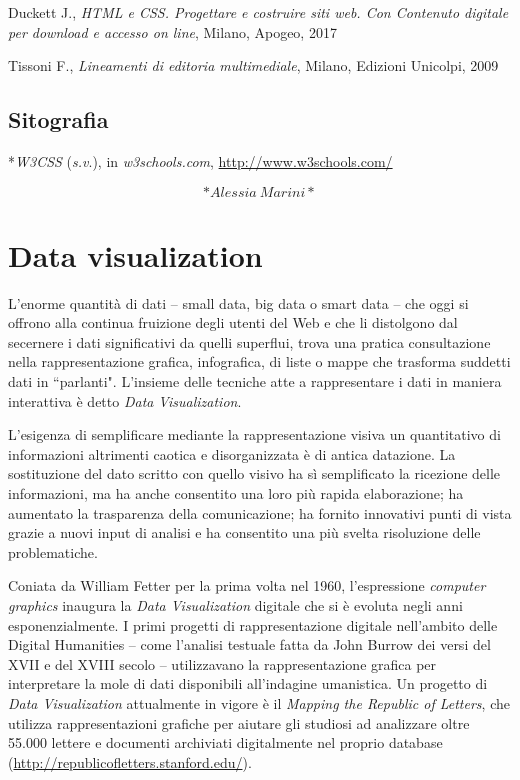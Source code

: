 \documentclass[
  b5paper,
  twoside,
  12pt,
  chapterprefix=false,
  bibliography=totocnumbered,
  parskip=false]{scrbook}
\begin{document}
Duckett J., \emph{HTML e CSS. Progettare e costruire siti web. Con Contenuto
digitale per download e accesso on line}, Milano, Apogeo, 2017

Tissoni F., \emph{Lineamenti di editoria multimediale}, Milano, Edizioni
Unicolpi, 2009

\hypertarget{sitografia-6}{%
\section*{Sitografia}\label{sitografia-6}}

*\emph{W3CSS} (\emph{s.v}.), in \emph{w3schools.com},
\url{http://www.w3schools.com/}

\[*Alessia~Marini*\]

\hypertarget{data-visualization}{%
\chapter{Data visualization}\label{data-visualization}}

L'enorme quantità di dati -- small data, big data o smart data -- che
oggi si offrono alla continua fruizione degli utenti del Web e che li
distolgono dal secernere i dati significativi da quelli superflui, trova
una pratica consultazione nella rappresentazione grafica, infografica,
di liste o mappe che trasforma suddetti dati in ``parlanti". L'insieme
delle tecniche atte a rappresentare i dati in maniera interattiva è
detto \emph{Data} \emph{Visualization}.

L'esigenza di semplificare mediante la rappresentazione visiva un
quantitativo di informazioni altrimenti caotica e disorganizzata è di
antica datazione. La sostituzione del dato scritto con quello visivo ha
sì semplificato la ricezione delle informazioni, ma ha anche consentito
una loro più rapida elaborazione; ha aumentato la trasparenza della
comunicazione; ha fornito innovativi punti di vista grazie a nuovi input
di analisi e ha consentito una più svelta risoluzione delle
problematiche.

Coniata da William Fetter per la prima volta nel 1960, l'espressione
\emph{computer} \emph{graphics} inaugura la \emph{Data Visualization} digitale che si è
evoluta negli anni esponenzialmente. I primi progetti di
rappresentazione digitale nell'ambito delle Digital Humanities -- come
l'analisi testuale fatta da John Burrow dei versi del XVII e del XVIII
secolo -- utilizzavano la rappresentazione grafica per interpretare la
mole di dati disponibili all'indagine umanistica. Un progetto di \emph{Data
Visualization} attualmente in vigore è il \emph{Mapping the Republic of
Letters}, che utilizza rappresentazioni grafiche per aiutare gli
studiosi ad analizzare oltre 55.000 lettere e documenti archiviati
digitalmente nel proprio database
(\url{http://republicofletters.stanford.edu/}).
\end{document}
